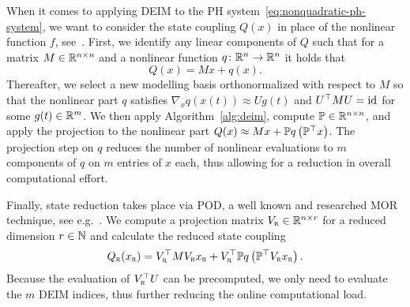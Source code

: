 When it comes to applying \ac{DEIM} to the \ac{PH} system~\eqref{eq:nonquadratic-ph-system}, we want to consider the state coupling $Q(x)$ in place of the nonlinear function $f$, see~\cite[Section~3]{Chaturantabut2016}.
First, we identify any linear components of $Q$ such that for a matrix $M \in \mathbb{R}^{n \times n}$ and a nonlinear function $q \colon \mathbb{R}^n \to \mathbb{R}^n$ it holds that
\begin{equation}\label{eq:deim-decomposition}
    Q(x) = M x + q(x).
\end{equation}
Thereafter, we select a new modelling basis orthonormalized with respect to $M$ so that the nonlinear part $q$ satisfies $\nabla_x q(x(t)) \approx U g(t)$ and $U^{\top} M U = \text{id}_{}$ for some $g(t) \in \mathbb{R}^m$.
We then apply Algorithm~\ref{alg:deim}, compute $\mathbb{P} \in \mathbb{R}^{n \times n}$, and apply the projection to the nonlinear part $Q(x) \approx M x + \mathbb{P} q\left( \mathbb{P}^{\top} x \right)$.
The projection step on $q$ reduces the number of nonlinear evaluations to $m$ components of $q$ on $m$ entries of $x$ each, thus allowing for a reduction in overall computational effort.

Finally, state reduction takes place via \ac{POD}, a well known and researched \ac{MOR} technique, see e.g.~\cite{Pinnau2008}.
We compute a projection matrix $V_{\textnormal{\scshape r}} \in \mathbb{R}^{n \times r}$ for a reduced dimension $r \in \mathbb{N}$ and calculate the reduced state coupling
\begin{equation*}
    Q_{\textnormal{\scshape r}}(x_{\textnormal{\scshape r}}) = V_{\textnormal{\scshape r}}^{\top} M V_{\textnormal{\scshape r}} x_{\textnormal{\scshape r}} + V_{\textnormal{\scshape r}}^{\top}  \mathbb{P} q\left( \mathbb{P}^{\top} V_{\textnormal{\scshape r}} x_{\textnormal{\scshape r}} \right).
\end{equation*}
Because the evaluation of $V_{\textnormal{\scshape r}}^{\top} U$ can be precomputed, we only need to evaluate the $m$ \ac{DEIM} indices, thus further reducing the online computational load.
